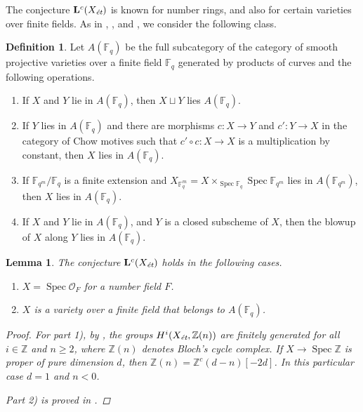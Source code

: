\documentclass[leqno,12pt]{article}
\theoremstyle{plain}
\newtheorem{lemma}[theorem]{\indent\sc Lemma}
\theoremstyle{definition}
\newtheorem{definition}[theorem]{\indent\sc Definition}
\DeclareMathOperator{\Spec}{Spec}
\newcommand{\ZZ}{\mathbb{Z}}
\newcommand{\FF}{\mathbb{F}}
\newcommand{\et}{\text{\it \'{e}t}}
\begin{document}
The conjecture $\mathbf{L}^c (X_\et)$ is known for number rings, and also for
certain varieties over finite fields. As in \cite{Soule-1984},
\cite{Geisser-2004}, and \cite{Morin-2014}, we consider the following class.

\begin{definition}
  Let $A (\FF_q)$ be the full subcategory of the category of smooth projective
  varieties over a finite field $\FF_q$ generated by products of curves and the
  following operations.
  \begin{enumerate}
  \item[1)] If $X$ and $Y$ lie in $A (\FF_q)$, then $X \sqcup Y$ lies
    $A (\FF_q)$.
  \item[2)] If $Y$ lies in $A (\FF_q)$ and there are morphisms $c\colon X\to Y$
    and $c'\colon Y\to X$ in the category of Chow motives such that
    $c'\circ c\colon X\to X$ is a multiplication by constant, then
    $X$ lies in $A (\FF_q)$.
  \item[3)] If $\FF_{q^m}/\FF_q$ is a finite extension and
    $X_{\FF_q^m} = X \times_{\Spec \FF_q} \Spec \FF_{q^m}$ lies in
    $A (\FF_{q^m})$, then $X$ lies in $A (\FF_q)$.
  \item[4)] If $X$ and $Y$ lie in $A (\FF_q)$, and $Y$ is a closed subscheme of
    $X$, then the blowup of $X$ along $Y$ lies in $A (\FF_q)$.
  \end{enumerate}
\end{definition}

\begin{lemma}
  \label{lemma:Lc(Xet)-holds-for-OF-and-A(Fq)}
  The conjecture $\mathbf{L}^c (X_\et)$ holds in the following cases.

  \begin{enumerate}
  \item[$1)$] $X = \Spec \mathcal{O}_F$ for a number field $F$.

  \item[$2)$] $X$ is a variety over a finite field that belongs to $A (\FF_q)$.
  \end{enumerate}

  \begin{proof}
    For part 1), by \cite[Theorem~5.1~(b)]{Morin-2014}, the groups
    $H^i (X_\et, \ZZ(n))$ are finitely generated for all $i \in \ZZ$ and
    $n \ge 2$, where $\ZZ (n)$ denotes Bloch's cycle complex. If
    $X \to \Spec \ZZ$ is proper of pure dimension $d$, then
    $\ZZ (n) = \ZZ^c (d-n) [-2d]$. In this particular case $d = 1$ and $n < 0$.

    Part 2) is proved in \cite[Proposition~5.7]{Morin-2014}.
  \end{proof}
\end{lemma}
\end{document}
